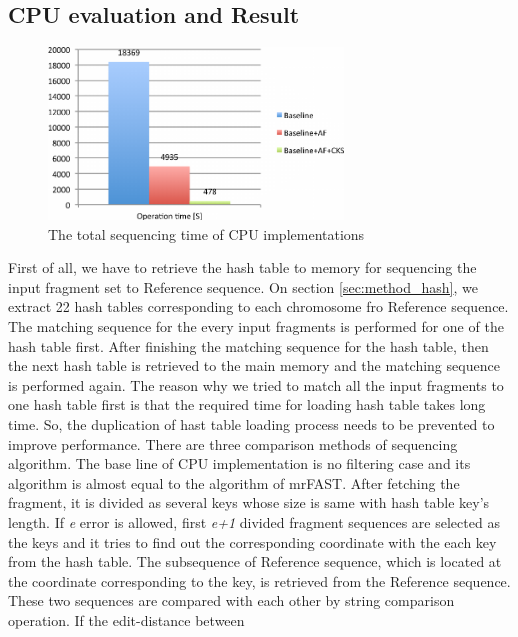 \subsection{CPU evaluation and Result} 
\begin{figure}[b] \centering
\vspace{0.1in}
\includegraphics[height=1.8in]{./figure/CPU_Result_B.pdf} \vspace{0in}
\caption{The total sequencing time of CPU implementations}
\label{fig:cpu_result} \end{figure}
First of all, we have to retrieve the hash table to memory for sequencing the
input fragment set to Reference sequence. On section \ref{sec:method_hash}, we
extract 22 hash tables corresponding to each chromosome fro Reference sequence.
The matching sequence for the every input fragments is performed for one of the
hash table first. After finishing the matching sequence for the hash table,
then the next hash table is retrieved to the main memory and the matching
sequence is performed again. The reason why we tried to match all the input
fragments to one hash table first is that the required time for loading hash
table takes long time. So, the duplication of hast table loading process needs
to be prevented to improve performance.  There are three comparison methods of
sequencing algorithm. The base line of CPU implementation is no filtering case
and its algorithm is almost equal to the algorithm of mrFAST. After fetching
the fragment, it is divided as several keys whose size is same with hash table
key’s length. If \textit{e} error is allowed, first \textit{e+1} divided
fragment sequences are selected as the keys and it tries to find out the
corresponding coordinate with the each key from the hash table. The subsequence
of Reference sequence, which is located at the coordinate corresponding to the
key, is retrieved from the Reference sequence. These two sequences are compared
with each other by string comparison operation. If the edit-distance between
